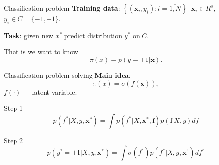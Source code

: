 \documentclass[12pt]{beamer}
\begin{document}
\begin{frame}{Classification problem}
\textbf{Training data}: $\left\{(\mathbf{x}_i, y_i) \colon i=\overline{1,N} \right\}$, $\mathbf{x}_i \in R^s$, $y_i \in C=\{-1, +1\}$.

\textbf{Task}: given new $x^*$ predict distribution $y^*$ on $C$. 

That is we want to know 
$$
\pi(x)=p(y=+1 | \mathbf{x}).
$$
\end{frame}

\begin{frame}{Classification problem solving}
\textbf{Main idea:} 
$$\pi(x)= \sigma(f(\mathbf{x})),$$
$f(\cdot)$ --- latent variable.
\begin{block}{Step 1}
$$p(f^* |X,y,\mathbf{x}^*) = \int{p(f^* |X,\mathbf{x}^*,\mathbf{f})p(\mathbf{f}|X,y)df}$$
\end{block}
\begin{block}{Step 2}
$$p(y^*=+1 |X,y,\mathbf{x}^*) = \int{\sigma(f^*) p(f^*|X,y,\mathbf{x}^*)df^*}$$
\end{block}

\end{frame}
\end{document}
